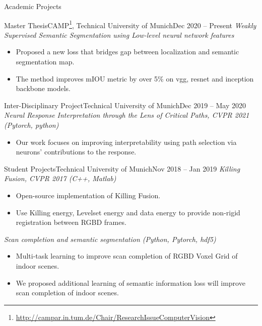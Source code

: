 \documentclass[]{mcdowellcv}
\begin{document}
    \makeheader
    
    \begin{cvsection}{Academic Projects}
    \begin{cvsubsection}[2]{Master Thesis}{CAMP\footnote{\href{http://campar.in.tum.de/Chair/ResearchIssueComputerVision}{http://campar.in.tum.de/Chair/ResearchIssueComputerVision}}, Technical University of Munich}{Dec 2020 -- Present}
    \textit{Weakly Supervised Semantic Segmentation using Low-level neural network features}
        \begin{itemize}
            \item Proposed a new loss that bridges gap between localization and semantic segmentation map.
            \item The method improves mIOU metric by over 5\% on vgg, resnet and inception backbone models.
        \end{itemize}
    \end{cvsubsection}
    
    \begin{cvsubsection}{Inter-Disciplinary Project}{Technical University of Munich}{Dec 2019 -- May 2020}
    \textit{Neural Response Interpretation through the Lens of Critical Paths, CVPR 2021 (Pytorch, python) \cite{khakzar-2021}}
        \begin{itemize}
        \item Our work focuses on improving interpretability using path selection via
neurons’ contributions to the response.
        \end{itemize}
    \end{cvsubsection}
    
    \begin{cvsubsection}{Student Projects}{Technical University of Munich}{Nov 2018 -- Jan 2019}
    \textit{Killing Fusion, CVPR 2017 (C++, Matlab) \cite{slavcheva2017killingfusion}}
        \begin{itemize}
        \item Open-source implementation of Killing Fusion.
        \item Use Killing energy, Levelset energy and data energy to provide non-rigid registration between RGBD frames.
        \end{itemize}
    \textit{Scan completion and semantic segmentation (Python, Pytorch, hdf5)}
        \begin{itemize}
        \item Multi-task learning to improve scan completion of RGBD Voxel Grid of indoor scenes.
        \item We proposed additional learning of semantic information loss will improve scan completion of indoor scenes.
        \end{itemize}
    \end{cvsubsection}
    
    \end{cvsection}
    
\end{document}
